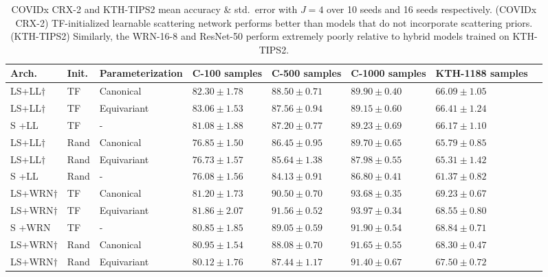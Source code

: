 \documentclass[10pt,twocolumn,letterpaper]{article}
\begin{document}
\begin{table*}[t] 
    \centering
    \vspace{-10pt}
    \caption{COVIDx CRX-2 and KTH-TIPS2 mean accuracy \& std.\ error with $J=4$ over 10 seeds and 16 seeds respectively. (COVIDx CRX-2) TF-initialized learnable scattering network performs better than models that do not incorporate scattering priors. (KTH-TIPS2) Similarly, the WRN-16-8 and ResNet-50 perform extremely poorly relative to hybrid models trained on KTH-TIPS2.}
    \label{table:covidresults}
      \fontsize{8}{8,5}\selectfont 
\begin{tabularx}{0.8\linewidth}{llllll|ll} 
             \hline
Arch.&Init. & Parameterization&C-100 samples & C-500 samples &C-1000 samples & KTH-1188 samples  \\
            \hline
            LS+LL$\dagger$&TF &Canonical& $82.30\pm1.78$ &$\mathbf{88.50}\pm0.71$ & $\mathbf{89.90}\pm0.40$ &$ 66.09\pm1.05 $  \\ 
            LS+LL$\dagger$&TF &Equivariant&$\mathbf{83.06}\pm1.53$ & $87.56\pm0.94$ &$89.15\pm0.60$ &$ \mathbf{66.41}\pm1.24$ \\
            S +LL&TF&-& $81.08\pm1.88$&$87.20\pm0.77$ &  $89.23\pm0.69$ &$66.17\pm1.10$\\
            LS+LL$\dagger$&Rand  &Canonical& $76.85\pm1.50$&$86.45\pm0.95$ & $89.70\pm0.65$& $65.79\pm 0.85$ \\
            LS+LL$\dagger$&Rand  &Equivariant&$76.73\pm1.57$ & $85.64\pm1.38$ &$87.98\pm0.55$ & $65.31\pm1.42$ \\
            S +LL&Rand &-& $76.08\pm1.56$&$84.13\pm0.91$ &  $86.80\pm0.41$ &$ 61.37\pm 0.82$\\[1mm]
            \hline
LS+WRN$\dagger$&TF &Canonical& $81.20\pm1.73$&$90.50\pm0.70$ & $93.68\pm0.35$&$\mathbf{69.23}\pm0.67$\\
            LS+WRN$\dagger$&TF &Equivariant&$\mathbf{81.86}\pm2.07$ & $\mathbf{91.56}\pm0.52$&$\mathbf{93.97}\pm0.34$&$68.55\pm0.80$\\
            S +WRN&TF &-&$80.85\pm1.85$&$89.05\pm0.59$ & $91.90\pm0.54$ &$68.84\pm0.71$ \\
            LS+WRN$\dagger$&Rand &Canonical&$80.95\pm1.54$&$88.08\pm0.70$ & $91.65\pm0.55$&$68.30\pm0.47$ \\
            LS+WRN$\dagger$&Rand &Equivariant&$80.12\pm1.76$ & $87.44\pm1.17$&$91.40\pm0.67$&$ 67.50\pm0.72$\\


\end{tabularx}
\end{table*}
\end{document}

